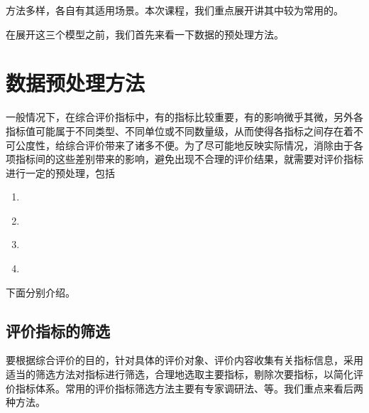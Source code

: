 \documentclass[letterpaper,10pt,english]{sphinxmanual}
\begin{document}
方法多样，各自有其适用场景。本次课程，我们重点展开讲其中较为常用的。

在展开这三个模型之前，我们首先来看一下数据的预处理方法。


\section{数据预处理方法}
\label{\detokenize{docs/evaluation_model:id3}}
一般情况下，在综合评价指标中，有的指标比较重要，有的影响微乎其微，另外各指标值可能属于不同类型、不同单位或不同数量级，从而使得各指标之间存在着不可公度性，给综合评价带来了诸多不便。为了尽可能地反映实际情况，消除由于各项指标间的这些差别带来的影响，避免出现不合理的评价结果，就需要对评价指标进行一定的预处理，包括
\begin{enumerate}
%
\item {} 
{\hyperref[\detokenize{docs/evaluation_model:content-choose-1}]{}}

\item {} 
{\hyperref[\detokenize{docs/evaluation_model:content-choose-2}]{}}

\item {} 
{\hyperref[\detokenize{docs/evaluation_model:content-choose-3}]{}}

\item {} 
{\hyperref[\detokenize{docs/evaluation_model:content-choose-4}]{}}

\end{enumerate}

下面分别介绍。


\subsection{评价指标的筛选}
\label{\detokenize{docs/evaluation_model:content-choose-1}}\label{\detokenize{docs/evaluation_model:id4}}
要根据综合评价的目的，针对具体的评价对象、评价内容收集有关指标信息，采用适当的筛选方法对指标进行筛选，合理地选取主要指标，剔除次要指标，以简化评价指标体系。常用的评价指标筛选方法主要有专家调研法、等。我们重点来看后两种方法。
\end{document}

